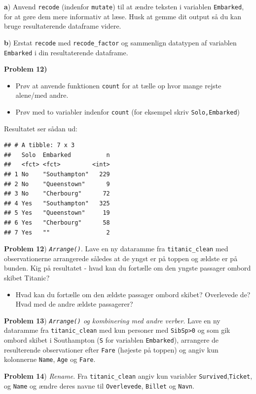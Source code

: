 \documentclass[
]{book}
\providecommand{\tightlist}{%
  \setlength{\itemsep}{0pt}\setlength{\parskip}{0pt}}
\begin{document}
\textbf{a}) Anvend \texttt{recode} (indenfor \texttt{mutate}) til at ændre teksten i variablen \texttt{Embarked}, for at gøre dem mere informativ at læse. Husk at gemme dit output så du kan bruge resultaterende dataframe videre.

\textbf{b}) Erstat \texttt{recode} med \texttt{recode\_factor} og sammenlign datatypen af variablen \texttt{Embarked} i din resultaterende dataframe.

\textbf{Problem 12)}

\begin{itemize}
\tightlist
\item
  Prøv at anvende funktionen \texttt{count} for at tælle op hvor mange rejste alene/med andre.
\item
  Prøv med to variabler indenfor \texttt{count} (for eksempel skriv \texttt{Solo,Embarked})
\end{itemize}

Resultatet ser sådan ud:

\begin{verbatim}
## # A tibble: 7 x 3
##   Solo  Embarked          n
##   <fct> <fct>         <int>
## 1 No    "Southampton"   229
## 2 No    "Queenstown"      9
## 3 No    "Cherbourg"      72
## 4 Yes   "Southampton"   325
## 5 Yes   "Queenstown"     19
## 6 Yes   "Cherbourg"      58
## 7 Yes   ""                2
\end{verbatim}

\textbf{Problem 12}) \emph{\texttt{Arrange()}}. Lave en ny dataramme fra \texttt{titanic\_clean} med observationerne arrangerede således at de yngst er på toppen og ældste er på bunden. Kig på resultatet - hvad kan du fortælle om den yngste passager ombord skibet Titanic?

\begin{itemize}
\tightlist
\item
  Hvad kan du fortælle om den ældste passager ombord skibet? Overlevede de? Hvad med de andre ældste passagerer?
\end{itemize}

\textbf{Problem 13}) \emph{\texttt{Arrange()} og kombinering med andre verber}. Lave en ny dataramme fra \texttt{titanic\_clean} med kun personer med \texttt{SibSp\textgreater{}0} og som gik ombord skibet i Southampton (\texttt{S} for variablen \texttt{Embarked}), arrangere de resulterende observationer efter \texttt{Fare} (højeste på toppen) og angiv kun kolonnerne \texttt{Name}, \texttt{Age} og \texttt{Fare}.

\textbf{Problem 14}) \emph{Rename}. Fra \texttt{titanic\_clean} angiv kun variabler \texttt{Survived},\texttt{Ticket}, og \texttt{Name} og ændre deres navne til \texttt{Overlevede}, \texttt{Billet} og \texttt{Navn}.
\end{document}
